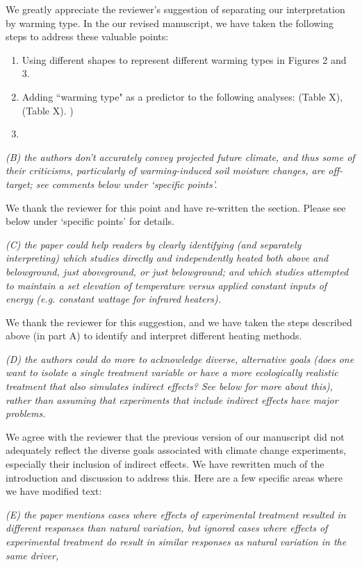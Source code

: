 \documentclass[11pt,a4paper]{letter}
\begin{document}
\begin{letter}{}
We greatly appreciate the reviewer's suggestion of separating our interpretation by warming type. In the our revised manuscript, we have taken the following steps to address these valuable points:
\begin{enumerate}
\item Using different shapes to represent different warming types in Figures 2 and 3.
\item Adding ``warming type" as a predictor to the following analyses: (Table X), (Table X). )
\item 
\end{enumerate}


\emph{(B) the authors don't accurately convey projected future climate, and thus some of their criticisms, particularly of warming-induced soil moisture changes, are off-target; see comments below under `specific points'.}

We thank the reviewer for this point and have re-written the section. Please see below under `specific points' for details.

\emph{(C) the paper could help readers by clearly identifying (and separately interpreting) which studies directly and independently heated both above and belowground, just aboveground, or just belowground; and which studies attempted to maintain a set elevation of temperature versus applied constant inputs of energy (e.g. constant wattage for infrared heaters).}

We thank the reviewer for this suggestion, and we have taken the steps described above (in part A) to identify and interpret different heating methods.

\emph{(D) the authors could do more to acknowledge diverse, alternative goals (does one want to isolate a single treatment variable or have a more ecologically realistic treatment that also simulates indirect effects? See below for more about this), rather than assuming that experiments that include indirect effects have major problems.}

We agree with the reviewer that the previous version of our manuscript did not adequately reflect the diverse goals associated with climate change experiments, especially their inclusion of indirect effects. We have rewritten much of the introduction and discussion to address this. Here are a few specific areas where we have modified text:


\emph{(E) the paper mentions cases where effects of experimental treatment resulted in different responses than natural variation, but ignored cases where effects of experimental treatment do result in similar responses as natural variation in the same driver,}


\end{letter}
\end{document}
